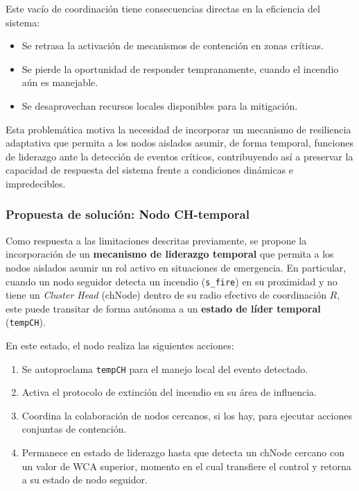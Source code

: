 \documentclass{article}
\begin{document}
Este vacío de coordinación tiene consecuencias directas en la eficiencia del sistema:
\begin{itemize}
    \item Se retrasa la activación de mecanismos de contención en zonas críticas.
    \item Se pierde la oportunidad de responder tempranamente, cuando el incendio aún es manejable.
    \item Se desaprovechan recursos locales disponibles para la mitigación.
\end{itemize}

Esta problemática motiva la necesidad de incorporar un mecanismo de resiliencia adaptativa que permita a los nodos aislados asumir, de forma temporal, funciones de liderazgo ante la detección de eventos críticos, contribuyendo así a preservar la capacidad de respuesta del sistema frente a condiciones dinámicas e impredecibles.





\subsubsection{Propuesta de solución: Nodo CH-temporal}
Como respuesta a las limitaciones descritas previamente, se propone la incorporación de un \textbf{mecanismo de liderazgo temporal} que permita a los nodos aislados asumir un rol activo en situaciones de emergencia. En particular, cuando un nodo seguidor detecta un incendio (\texttt{s\_fire}) en su proximidad y no tiene un \textit{Cluster Head} (chNode) dentro de su radio efectivo de coordinación $R$, este puede transitar de forma autónoma a un \textbf{estado de líder temporal} (\texttt{tempCH}).

En este estado, el nodo realiza las siguientes acciones:
\begin{enumerate}
    \item Se autoproclama \texttt{tempCH} para el manejo local del evento detectado.
    \item Activa el protocolo de extinción del incendio en su área de influencia.
    \item Coordina la colaboración de nodos cercanos, si los hay, para ejecutar acciones conjuntas de contención.
    \item Permanece en estado de liderazgo hasta que detecta un chNode cercano con un valor de WCA superior, momento en el cual transfiere el control y retorna a su estado de nodo seguidor.
\end{enumerate}
\end{document}

